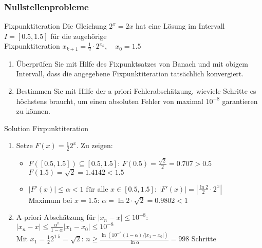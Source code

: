 \subsubsection{Nullstellenprobleme}



\begin{example2}{Fixpunktiteration}
Die Gleichung $2^x = 2x$ hat eine Lösung im Intervall $I = [0.5, 1.5]$ für die zugehörige \\Fixpunktiteration
$x_{k+1} = \frac{1}{2} \cdot 2^{x_k}, \quad x_0 = 1.5$
\begin{enumerate}
    \item Überprüfen Sie mit Hilfe des Fixpunktsatzes von Banach und mit obigem Intervall, dass die angegebene Fixpunktiteration tatsächlich konvergiert.
    
    \item Bestimmen Sie mit Hilfe der a priori Fehlerabschätzung, wieviele Schritte es höchstens braucht, um einen absoluten Fehler von maximal $10^{-8}$ garantieren zu können.
\end{enumerate}
\end{example2}

\begin{KR}{Solution Fixpunktiteration}
\begin{enumerate}
    \item Setze $F(x) = \frac{1}{2}2^x$. Zu zeigen:
    \begin{itemize}
        \item $F([0.5,1.5]) \subseteq [0.5,1.5]$:
        $F(0.5) = \frac{\sqrt{2}}{2} = 0.707 > 0.5$\\
        $F(1.5) = \sqrt{2} = 1.4142 < 1.5$ \checkmark
        
        \item $|F'(x)| \leq \alpha < 1$ für alle $x \in [0.5,1.5]$:
        $|F'(x)| = |\frac{\ln 2}{2} \cdot 2^x|$\\
        Maximum bei $x=1.5$: $\alpha = \ln 2 \cdot \sqrt{2} = 0.9802 < 1$ \checkmark
    \end{itemize}
    
    \item A-priori Abschätzung für $|x_n - x| \leq 10^{-8}$:\\
    $|x_n - x| \leq \frac{\alpha^n}{1-\alpha}|x_1-x_0| \leq 10^{-8}$\\
    Mit $x_1 = \frac{1}{2}2^{1.5} = \sqrt{2}$:
    $n \geq \frac{\ln(10^{-8}(1-\alpha)/|x_1-x_0|)}{\ln \alpha} = 998$ Schritte
\end{enumerate}
\end{KR}





